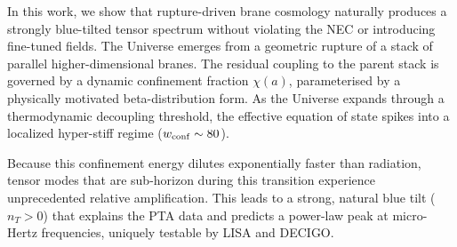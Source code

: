 \documentclass[twocolumn, PRD, amsmath, amssymb, aps, nofootinbib]{revtex4-2}
\begin{document}
In this work, we show that rupture-driven brane cosmology naturally produces a strongly blue-tilted tensor spectrum without violating the NEC or introducing fine-tuned fields. The Universe emerges from a geometric rupture of a stack of parallel higher-dimensional branes. The residual coupling to the parent stack is governed by a dynamic confinement fraction $\chi(a)$, parameterised by a physically motivated beta-distribution form. As the Universe expands through a thermodynamic decoupling threshold, the effective equation of state spikes into a localized hyper-stiff regime ($w_{\rm conf} \sim 80$).

Because this confinement energy dilutes exponentially faster than radiation, tensor modes that are sub-horizon during this transition experience unprecedented relative amplification. This leads to a strong, natural blue tilt ($n_T > 0$) that explains the PTA data and predicts a power-law peak at micro-Hertz frequencies, uniquely testable by LISA and DECIGO.
\end{document}
